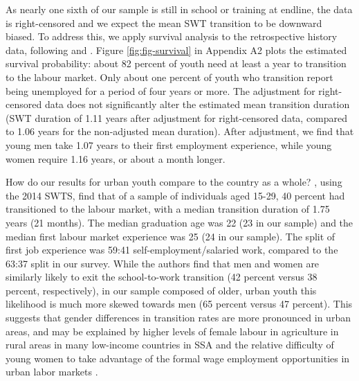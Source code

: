 \documentclass[
  a4paper, twoside, 12pt]{book}
\begin{document}
As nearly one sixth of our sample is still in school or training at endline, the data is right-censored and we expect the mean SWT transition to be downward biased. To address this, we apply survival analysis to the retrospective history data, following \textcite{nordman2015} and \textcite{manacorda2017}. Figure \ref{fig:fig-survival} in Appendix A2 plots the estimated survival probability: about 82 percent of youth need at least a year to transition to the labour market. Only about one percent of youth who transition report being unemployed for a period of four years or more. The adjustment for right-censored data does not significantly alter the estimated mean transition duration (SWT duration of 1.11 years after adjustment for right-censored data, compared to 1.06 years for the non-adjusted mean duration). After adjustment, we find that young men take 1.07 years to their first employment experience, while young women require 1.16 years, or about a month longer.

How do our results for urban youth compare to the country as a whole? \textcite{dedehouanou2019}, using the 2014 SWTS, find that of a sample of individuals aged 15-29, 40 percent had transitioned to the labour market, with a median transition duration of 1.75 years (21 months). The median graduation age was 22 (23 in our sample) and the median first labour market experience was 25 (24 in our sample). The split of first job experience was 59:41 self-employment/salaried work, compared to the 63:37 split in our survey. While the authors find that men and women are similarly likely to exit the school-to-work transition (42 percent versus 38 percent, respectively), in our sample composed of older, urban youth this likelihood is much more skewed towards men (65 percent versus 47 percent). This suggests that gender differences in transition rates are more pronounced in urban areas, and may be explained by higher levels of female labour in agriculture in rural areas in many low-income countries in SSA \autocite{croppenstedt2013} and the relative difficulty of young women to take advantage of the formal wage employment opportunities in urban labor markets \autocite{fox2012,fox2016a}.
\end{document}
